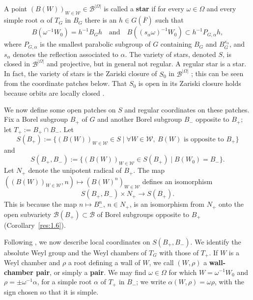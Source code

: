 \documentclass[12pt,letterpaper]{amsart}
\theoremstyle{plain}
\theoremstyle{definition}
\theoremstyle{remark}
\theoremstyle{definition}
\begin{document}
A point
$(B(W))_{W\in{\mathcal W}}\in {\mathcal B}^{|\Omega|}$ is called a
\textbf{star} if for every $\omega\in\Omega$ and every simple root $\alpha$
of $T_G$ in $B_G$ there is an $h\in G(\overline{F})$
such that
\[
B(\omega^{-1}W_0)=h^{-1}B_Gh
\quad\text{and}\quad
B((s_\alpha\omega)^{-1}W_0)\subset h^{-1}P_{G,\alpha} h,
\]
where ${P}_{G,\alpha}$ is the smallest parabolic subgroup
of $G$ containing $B_G$ and $B_G^{s_\alpha}$, and
$s_\alpha$ denotes the reflection associated to
$\alpha$. The variety of stars,
denoted $S$, is closed in ${\mathcal B}^{|\Omega |}$ and projective,
but in general not regular.
A regular star is a star.
In fact, the variety of stars is the Zariski closure of $S_0$
in ${\mathcal B}^{|\Omega|}$ \cite{La83}; this can be seen from the
coordinate patches below. That $S_0$ is
open in its Zariski closure holds because orbits are locally closed
\cite[II.6, Prop.~6.7]{Bor91}.

We now define some open patches on $S$ and regular
coordinates on these patches.
Fix a Borel subgroup $B_+$ of $G$ and another Borel subgroup $B_-$
opposite to $B_+$; let $T_+:=B_+\cap B_-$. Let
\[
S(B_+):=\{(B(W))_{W\in{\mathcal W}}\in S \mid \forall W\in{\mathcal W},\
B(W) \text{ is opposite to }B_+\}
\]
and
\[
S(B_+,B_-):=\{(B(W))_{W\in{\mathcal W}}\in S(B_+)
\mid B(W_0)=B_-\}.
\]
Let $N_+$ denote the unipotent radical of $B_+$. The map
$((B(W))_{W\in{\mathcal W}},n)\longmapsto (B(W)^n)_{W\in{\mathcal W}}$
defines an isomorphism
\begin{equation}\tag{1.7}\label{eq:1.7}
S(B_+,B_-)\times N_+ \rightarrow S(B_+).
\end{equation}
This is because the map
$n\longmapsto B_-^n$, $n\in N_+$, is an isomorphism from
$N_+$ onto the open subvariety ${\mathcal B}(B_+)\subset {\mathcal B}$
of Borel subgroups opposite to $B_+$ (Corollary~\ref{res:1.6}).

Following \cite{La83}, we now describe local coordinates on
$S(B_+,B_-)$.
We identify the absolute Weyl group and the Weyl chambers of $T_G$ with those
of $T_+$.
If $W$ is a Weyl chamber and $\rho$ a
root defining a wall of $W$, we call $(W,\rho)$ a
\textbf{wall-chamber pair}, or simply a \textbf{pair}.
We may find $\omega\in\Omega$ for which
$W=\omega^{-1}W_0$ and $\rho=\pm\omega^{-1}\alpha$, for a
simple root $\alpha$ of $T_+$ in $B_-$;
we write $\alpha(W,\rho)=\omega\rho$, with the sign chosen so that it is
simple.
\end{document}
